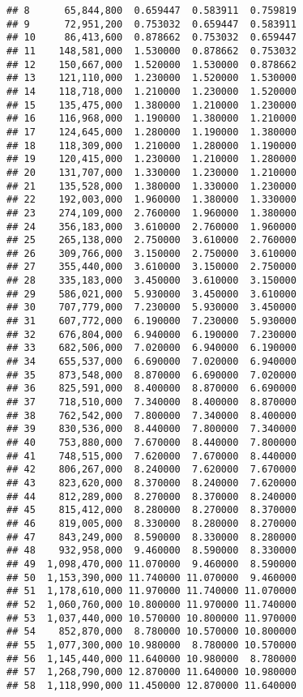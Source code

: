 \documentclass[]{article}
\begin{document}
\begin{verbatim}
## 8      65,844,800  0.659447  0.583911  0.759819
## 9      72,951,200  0.753032  0.659447  0.583911
## 10     86,413,600  0.878662  0.753032  0.659447
## 11    148,581,000  1.530000  0.878662  0.753032
## 12    150,667,000  1.520000  1.530000  0.878662
## 13    121,110,000  1.230000  1.520000  1.530000
## 14    118,718,000  1.210000  1.230000  1.520000
## 15    135,475,000  1.380000  1.210000  1.230000
## 16    116,968,000  1.190000  1.380000  1.210000
## 17    124,645,000  1.280000  1.190000  1.380000
## 18    118,309,000  1.210000  1.280000  1.190000
## 19    120,415,000  1.230000  1.210000  1.280000
## 20    131,707,000  1.330000  1.230000  1.210000
## 21    135,528,000  1.380000  1.330000  1.230000
## 22    192,003,000  1.960000  1.380000  1.330000
## 23    274,109,000  2.760000  1.960000  1.380000
## 24    356,183,000  3.610000  2.760000  1.960000
## 25    265,138,000  2.750000  3.610000  2.760000
## 26    309,766,000  3.150000  2.750000  3.610000
## 27    355,440,000  3.610000  3.150000  2.750000
## 28    335,183,000  3.450000  3.610000  3.150000
## 29    586,021,000  5.930000  3.450000  3.610000
## 30    707,779,000  7.230000  5.930000  3.450000
## 31    607,772,000  6.190000  7.230000  5.930000
## 32    676,804,000  6.940000  6.190000  7.230000
## 33    682,506,000  7.020000  6.940000  6.190000
## 34    655,537,000  6.690000  7.020000  6.940000
## 35    873,548,000  8.870000  6.690000  7.020000
## 36    825,591,000  8.400000  8.870000  6.690000
## 37    718,510,000  7.340000  8.400000  8.870000
## 38    762,542,000  7.800000  7.340000  8.400000
## 39    830,536,000  8.440000  7.800000  7.340000
## 40    753,880,000  7.670000  8.440000  7.800000
## 41    748,515,000  7.620000  7.670000  8.440000
## 42    806,267,000  8.240000  7.620000  7.670000
## 43    823,620,000  8.370000  8.240000  7.620000
## 44    812,289,000  8.270000  8.370000  8.240000
## 45    815,412,000  8.280000  8.270000  8.370000
## 46    819,005,000  8.330000  8.280000  8.270000
## 47    843,249,000  8.590000  8.330000  8.280000
## 48    932,958,000  9.460000  8.590000  8.330000
## 49  1,098,470,000 11.070000  9.460000  8.590000
## 50  1,153,390,000 11.740000 11.070000  9.460000
## 51  1,178,610,000 11.970000 11.740000 11.070000
## 52  1,060,760,000 10.800000 11.970000 11.740000
## 53  1,037,440,000 10.570000 10.800000 11.970000
## 54    852,870,000  8.780000 10.570000 10.800000
## 55  1,077,300,000 10.980000  8.780000 10.570000
## 56  1,145,440,000 11.640000 10.980000  8.780000
## 57  1,268,790,000 12.870000 11.640000 10.980000
## 58  1,118,990,000 11.450000 12.870000 11.640000

\end{verbatim}
\end{document}
